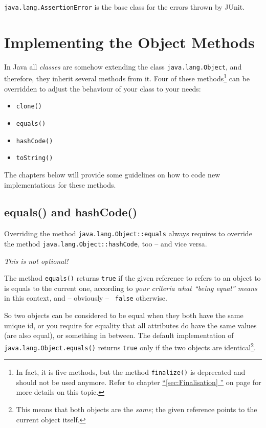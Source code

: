 \documentclass[11pt,a4paper, titlepage, parskip=half, headsepline, footsepline, cleardoublepage=current, headheight=1cm]{scrbook}
\newcommand*{\tqfullvref}[1]{\hyperref[{#1}]{“\ref*{#1} \nameref*{#1}”} on page \pageref{#1}}
\begin{document}
\lstinline|java.lang.AssertionError|\autocite{ORACLE_DOC_ASSERTIONERROR_CLASS} is the base class for the errors thrown by JUnit\autocite{JUNIT5}.

\section{Implementing the Object Methods}
In Java all \textit{classes} are somehow extending the class \lstinline|java.lang.Object|\autocite{ORACLE_DOC_OBJECT_CLASS}, and therefore, they inherit several methods from it. Four of these methods\footnote{In fact, it is five methods, but the method \lstinline|finalize()|\autocite{ORACLE_DOC_OBJECT_CLASS:finalize} is deprecated and should not be used anymore. Refer to chapter \tqfullvref{sec:Finalisation} for more details on this topic.} can be overridden to adjust the behaviour of your class to your needs:
\begin{itemize}[nosep]
\item{\lstinline|clone()|\autocite{ORACLE_DOC_OBJECT_CLASS:clone}}
\item{\lstinline|equals()|\autocite{ORACLE_DOC_OBJECT_CLASS:equals}}
\item{\lstinline|hashCode()|\autocite{ORACLE_DOC_OBJECT_CLASS:hashCode}}
\item{\lstinline|toString()|\autocite{ORACLE_DOC_OBJECT_CLASS:toString}}
\end{itemize}

The chapters below will provide some guidelines on how to code new implementations for these methods.

\subsection{equals() and hashCode()}\label{sec:EqualsAndHashCode}
Overriding the method \lstinline|java.lang.Object::equals|\autocite{ORACLE_DOC_OBJECT_CLASS:equals} always requires to override the method \lstinline|java.lang.Object::hashCode|\autocite{ORACLE_DOC_OBJECT_CLASS:hashCode}, too – and vice versa.

\textit{This is not optional!}

The method \lstinline|equals()| returns \lstinline|true| if the given reference to refers to an object to is equals to the current one, according to \textit{your criteria what “being equal” means} in this context, and – obviously – \lstinline| false| otherwise.

So two objects can be considered to be equal when they both have the same unique id, or you require for equality that all attributes do have the same values (are also equal), or something in between. The default implementation of \lstinline|java.lang.Object.equals()| returns \lstinline|true| only if the two objects are identical\footnote{This means that both objects are the \textit{same}; the given reference points to the current object itself.}.
\end{document}
